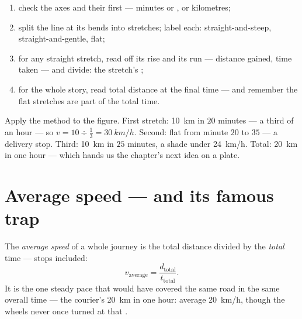 \begin{method}\label{met:g7:motion-average-speed:read}
\begin{enumerate}
  \item check the axes and their  first --- minutes or
        ,  or kilometres;
  \item split the line at its bends into stretches; label each:
        straight-and-steep, straight-and-gentle, flat;
  \item for any straight stretch, read off its rise and its run
        --- distance gained, time taken --- and divide: the
        stretch's ;
  \item for the whole story, read total distance at the final
        time --- and remember the flat stretches are part of the
        total time.
\end{enumerate}
\end{method}

\begin{example}\label{ex:g7:motion-average-speed:decoded}
Apply the method to the figure. First stretch: \qty{10}{km} in
$20$ minutes --- a third of an hour --- so $v = 10 \div
\tfrac{1}{3} = \qty{30}{km/h}$. Second: flat from minute $20$ to
$35$ --- a delivery stop. Third: \qty{10}{km} in $25$ minutes,
a shade under \qty{24}{km/h}. Total: \qty{20}{km} in one hour
--- which hands us the chapter's next idea on a plate.
\end{example}

\section{Average speed --- and its famous trap}

\begin{definition}\label{def:g7:motion-average-speed:average}
The \emph{average speed} of a whole journey
is the total distance divided by the \emph{total} time --- stops
included:
\[
v_{\text{average}} = \frac{d_{\text{total}}}{t_{\text{total}}}.
\]
It is the one steady pace that would have covered the same road
in the same overall time --- the courier's \qty{20}{km} in one
hour: average \qty{20}{km/h}, though the wheels never once
turned at that .
\end{definition}

